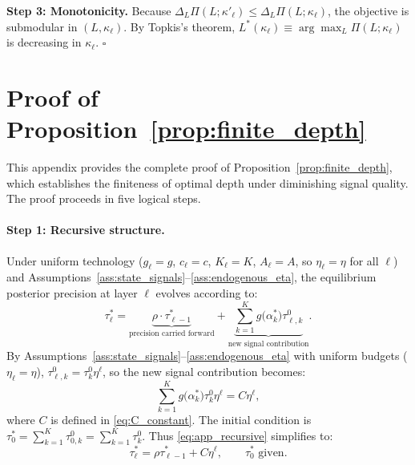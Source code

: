 \textbf{Step 3: Monotonicity.} Because $\Delta_L \Pi(L; \kappa'_\ell) \leq \Delta_L \Pi(L; \kappa_\ell)$, the objective is submodular in $(L, \kappa_\ell)$. By Topkis's theorem, $L^*(\kappa_\ell) \equiv \arg\max_L \Pi(L; \kappa_\ell)$ is decreasing in $\kappa_\ell$. \hfill $\square$

\section{Proof of Proposition~\ref{prop:finite_depth}}
\label{app:proof_prop7}

\renewcommand{\theequation}{A.7.\arabic{equation}}
\setcounter{equation}{0}

This appendix provides the complete proof of Proposition~\ref{prop:finite_depth}, which establishes the finiteness of optimal depth under diminishing signal quality. The proof proceeds in five logical steps.

\paragraph{Step 1: Recursive structure.}
Under uniform technology ($g_{\ell} = g$, $c_{\ell} = c$, $K_{\ell} = K$, $A_{\ell} = A$, so $\eta_{\ell} = \eta$ for all $\ell$) and Assumptions~\ref{ass:state_signals}--\ref{ass:endogenous_eta}, the equilibrium posterior precision at layer $\ell$ evolves according to:
\begin{equation}\label{eq:app_recursive}
\tau^{*}_{\ell} = \underbrace{\rho \cdot \tau^{*}_{\ell-1}}_{\text{precision carried forward}} + \underbrace{\sum_{k=1}^{K} g\bigl(\alpha^{*}_{k}\bigr) \tau^{0}_{\ell,k}}_{\text{new signal contribution}}.
\end{equation}
By Assumptions~\ref{ass:state_signals}--\ref{ass:endogenous_eta} with uniform budgets ($\eta_\ell = \eta$), $\tau^{0}_{\ell,k} = \tau^{0}_{k} \eta^{\ell}$, so the new signal contribution becomes:
\begin{equation}\label{eq:app_C_def}
\sum_{k=1}^{K} g\bigl(\alpha^{*}_{k}\bigr) \tau^{0}_{k} \eta^{\ell} = C \eta^{\ell},
\end{equation}
where $C$ is defined in \eqref{eq:C_constant}. The initial condition is $\tau^{*}_{0} = \sum_{k=1}^{K} \tau^{0}_{0,k} = \sum_{k=1}^{K} \tau^{0}_{k}$. Thus \eqref{eq:app_recursive} simplifies to:
\begin{equation}\label{eq:app_simplified_recurrence}
\tau^{*}_{\ell} = \rho \tau^{*}_{\ell-1} + C \eta^{\ell}, \qquad \tau^{*}_{0} \text{ given}.
\end{equation}

